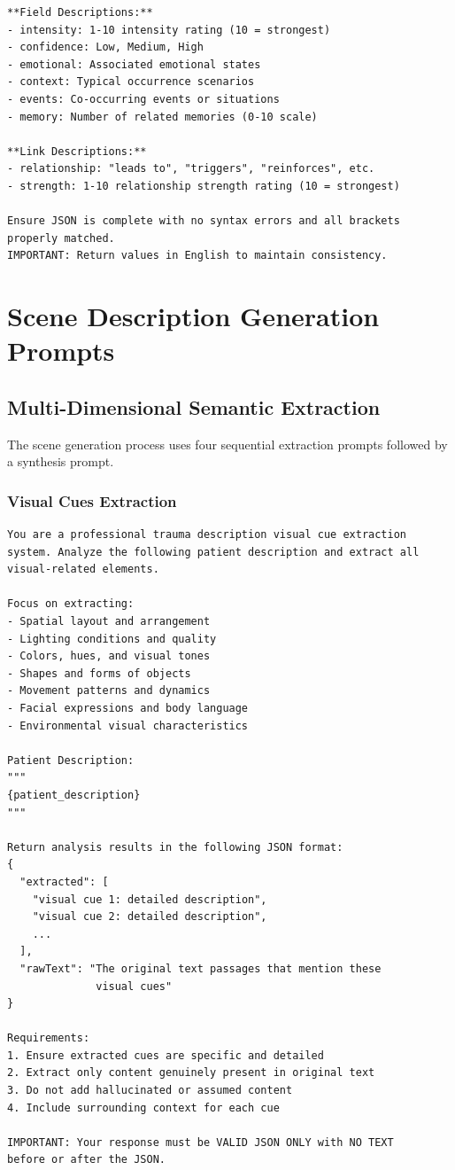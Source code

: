 \documentclass[sigconf,review,anonymous]{acmart}
\begin{document}
\begin{lstlisting}
**Field Descriptions:**
- intensity: 1-10 intensity rating (10 = strongest)
- confidence: Low, Medium, High
- emotional: Associated emotional states
- context: Typical occurrence scenarios
- events: Co-occurring events or situations
- memory: Number of related memories (0-10 scale)

**Link Descriptions:**
- relationship: "leads to", "triggers", "reinforces", etc.
- strength: 1-10 relationship strength rating (10 = strongest)

Ensure JSON is complete with no syntax errors and all brackets 
properly matched.
IMPORTANT: Return values in English to maintain consistency.
\end{lstlisting}

\section{Scene Description Generation Prompts}
\label{sec:scene}

\subsection{Multi-Dimensional Semantic Extraction}

The scene generation process uses four sequential extraction prompts followed by a synthesis prompt.

\subsubsection{Visual Cues Extraction}

\begin{lstlisting}
You are a professional trauma description visual cue extraction 
system. Analyze the following patient description and extract all 
visual-related elements.

Focus on extracting:
- Spatial layout and arrangement
- Lighting conditions and quality
- Colors, hues, and visual tones
- Shapes and forms of objects
- Movement patterns and dynamics
- Facial expressions and body language
- Environmental visual characteristics

Patient Description:
"""
{patient_description}
"""

Return analysis results in the following JSON format:
{
  "extracted": [
    "visual cue 1: detailed description",
    "visual cue 2: detailed description",
    ...
  ],
  "rawText": "The original text passages that mention these 
              visual cues"
}

Requirements:
1. Ensure extracted cues are specific and detailed
2. Extract only content genuinely present in original text
3. Do not add hallucinated or assumed content
4. Include surrounding context for each cue

IMPORTANT: Your response must be VALID JSON ONLY with NO TEXT 
before or after the JSON.
\end{lstlisting}
\end{document}
